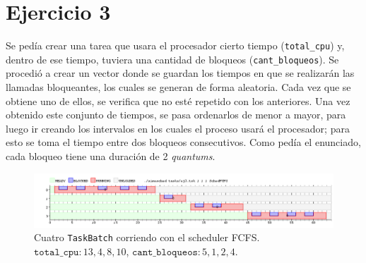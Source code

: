 \section{Ejercicio 3}
	Se pedía crear una tarea que usara el procesador cierto tiempo
	(\texttt{total\_cpu}) y, dentro de ese tiempo, tuviera una cantidad de
	bloqueos (\texttt{cant\_bloqueos}). Se procedió a crear un vector donde se
	guardan los tiempos en que se realizarán las llamadas bloqueantes, los
	cuales se generan de forma aleatoria. Cada vez que se obtiene uno de ellos,
	se verifica que no esté repetido con los anteriores. Una vez obtenido este
	conjunto de tiempos, se pasa ordenarlos de menor a mayor, para luego ir
	creando los intervalos en los cuales el proceso usará el procesador; para
	esto se toma el tiempo entre dos bloqueos consecutivos. Como pedía el
	enunciado, cada bloqueo tiene una duración de 2 \emph{quantums}.

	\begin{figure}[ht]
		\begin{center}
			\includegraphics[width=1\columnwidth]{imagenes/ej3.png}
			\caption{Cuatro \texttt{TaskBatch} corriendo con el scheduler FCFS. $\texttt{total\_cpu}:13, 4, 8, 10$, $\texttt{cant\_bloqueos}:5, 1, 2, 4 $.}
		\end{center}
	\end{figure}

